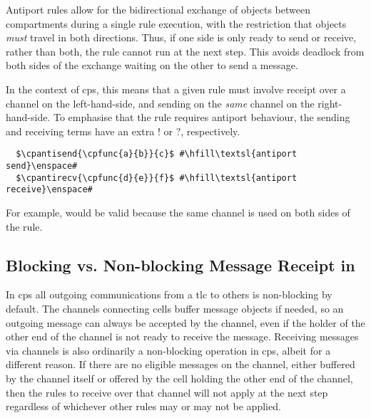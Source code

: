 
Antiport rules \cite{Orellana-Martin2019,Paun2002} allow for the bidirectional exchange of objects between \glspl{compartment} during a single rule execution, with the restriction that objects \emph{must} travel in both directions.  Thus, if one side is only ready to send or receive, rather than both, the rule cannot run at the next step.  This avoids deadlock from both sides of the exchange waiting on the other to send a message.

In the context of \gls{cps}, this means that a given rule must involve receipt over a channel on the left-hand-side, and sending on the \emph{same} channel on the right-hand-side.  To emphasise that the rule requires antiport behaviour, the sending and receiving terms have an extra \(!\) or \(?\), respectively.

\lstset{xleftmargin=.5in, xrightmargin=.5in} 
\begin{lstlisting}
  $\cpantisend{\cpfunc{a}{b}}{c}$ #\hfill\textsl{antiport send}\enspace#
  $\cpantirecv{\cpfunc{d}{e}}{f}$ #\hfill\textsl{antiport receive}\enspace#
\end{lstlisting}

For example,  would be valid because the same channel is used on both sides of the rule.

\subsection{\label{sec:cps:blocking}Blocking vs. Non-blocking Message Receipt in }

In \gls{cps} all outgoing communications from a \gls{tlc} to others is non-blocking by default.  The channels connecting cells buffer message objects if needed, so an outgoing message can always be accepted by the channel, even if the holder of the other end of the channel is not ready to receive the message.  Receiving messages via channels is also ordinarily a non-blocking operation in \gls{cps}, albeit for a different reason.  If there are no eligible messages on the channel, either buffered by the channel itself or offered by the cell holding the other end of the channel, then the rules to receive over that channel will not apply at the next step regardless of whichever other rules may or may not be applied.

